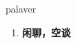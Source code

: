 
\begin{frame}
{\huge palaver}
\begin{center}
\begin{enumerate}\Large
  \item \textbf{闲聊，空谈}
\end{enumerate}
\end{center}
\end{frame}
